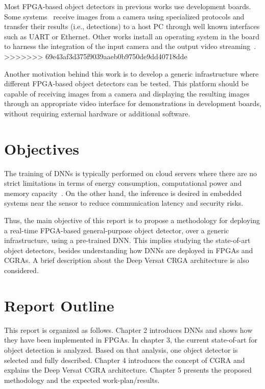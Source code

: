 Most FPGA-based object detectors in previous works use development boards. Some systems~\citep{long:fpga_demo, bochem:fpga_demo} receive images from a camera using specialized protocols and transfer their results (i.e., detections) to a host PC through well known interfaces such as UART or Ethernet. Other works install an operating system in the board to harness the integration of the input camera and the output video streaming~\cite{llorente:fpga_demo}.
>>>>>>> 69e43af3d375f9039aaeb0b9750de9dd40718dde

Another motivation behind this work is to develop a generic infrastructure where different FPGA-based object detectors can be tested. This platform should be capable of receiving images from a camera and displaying the resulting images through an appropriate video interface for demonstrations in development boards, without requiring external hardware or additional software.  

\section{Objectives}
\label{section:objectives}

The training of DNNs is typically performed on cloud servers where there are no strict limitations in terms of energy consumption, computational power and memory capacity~\cite{sze:dnn_survey}. On the other hand, the inference is desired in embedded systems near the sensor to reduce communication latency and security risks. 

Thus, the main objective of this report is to propose a methodology for deploying a real-time FPGA-based general-purpose object detector, over a generic infrastructure, using a pre-trained DNN. This implies studying the state-of-art object detectors, besides understanding how DNNs are deployed in FPGAs and CGRAs. A brief description about the Deep Versat CRGA architecture is also considered.

\section{Report Outline}
\label{section:outline}

This report is organized as follows. Chapter 2 introduces DNNs and shows how they have been implemented in FPGAs. In chapter 3, the current state-of-art for object detection is analyzed. Based on that analysis, one object detector is selected and fully described. Chapter 4 introduces the concept of CGRA and explains the Deep Versat CGRA architecture. Chapter 5 presents the proposed methodology and the expected work-plan/results.